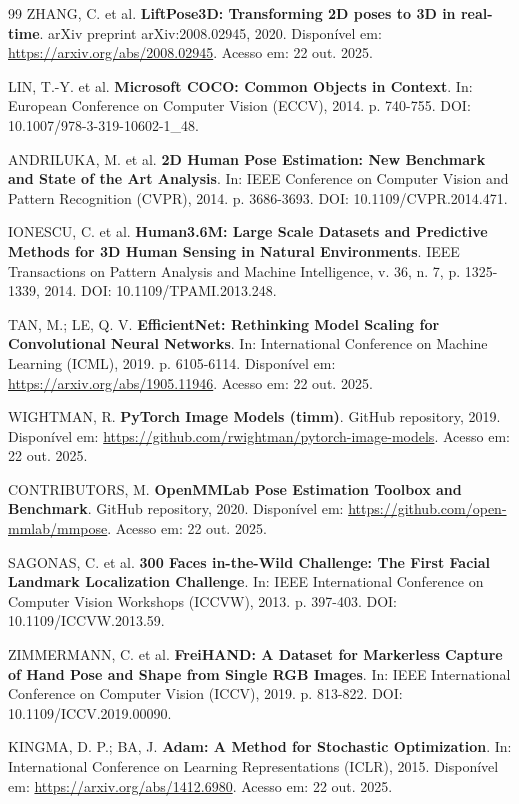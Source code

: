 \documentclass[12pt, a4paper]{article}
\begin{document}
\begin{thebibliography}{99}
ZHANG, C. et al. \textbf{LiftPose3D: Transforming 2D poses to 3D in real-time}. arXiv preprint arXiv:2008.02945, 2020. Disponível em: \url{https://arxiv.org/abs/2008.02945}. Acesso em: 22 out. 2025.

LIN, T.-Y. et al. \textbf{Microsoft COCO: Common Objects in Context}. In: European Conference on Computer Vision (ECCV), 2014. p. 740-755. DOI: 10.1007/978-3-319-10602-1\_48.

ANDRILUKA, M. et al. \textbf{2D Human Pose Estimation: New Benchmark and State of the Art Analysis}. In: IEEE Conference on Computer Vision and Pattern Recognition (CVPR), 2014. p. 3686-3693. DOI: 10.1109/CVPR.2014.471.

IONESCU, C. et al. \textbf{Human3.6M: Large Scale Datasets and Predictive Methods for 3D Human Sensing in Natural Environments}. IEEE Transactions on Pattern Analysis and Machine Intelligence, v. 36, n. 7, p. 1325-1339, 2014. DOI: 10.1109/TPAMI.2013.248.

TAN, M.; LE, Q. V. \textbf{EfficientNet: Rethinking Model Scaling for Convolutional Neural Networks}. In: International Conference on Machine Learning (ICML), 2019. p. 6105-6114. Disponível em: \url{https://arxiv.org/abs/1905.11946}. Acesso em: 22 out. 2025.

WIGHTMAN, R. \textbf{PyTorch Image Models (timm)}. GitHub repository, 2019. Disponível em: \url{https://github.com/rwightman/pytorch-image-models}. Acesso em: 22 out. 2025.

CONTRIBUTORS, M. \textbf{OpenMMLab Pose Estimation Toolbox and Benchmark}. GitHub repository, 2020. Disponível em: \url{https://github.com/open-mmlab/mmpose}. Acesso em: 22 out. 2025.

SAGONAS, C. et al. \textbf{300 Faces in-the-Wild Challenge: The First Facial Landmark Localization Challenge}. In: IEEE International Conference on Computer Vision Workshops (ICCVW), 2013. p. 397-403. DOI: 10.1109/ICCVW.2013.59.

ZIMMERMANN, C. et al. \textbf{FreiHAND: A Dataset for Markerless Capture of Hand Pose and Shape from Single RGB Images}. In: IEEE International Conference on Computer Vision (ICCV), 2019. p. 813-822. DOI: 10.1109/ICCV.2019.00090.

KINGMA, D. P.; BA, J. \textbf{Adam: A Method for Stochastic Optimization}. In: International Conference on Learning Representations (ICLR), 2015. Disponível em: \url{https://arxiv.org/abs/1412.6980}. Acesso em: 22 out. 2025.


\end{thebibliography}
\end{document}

